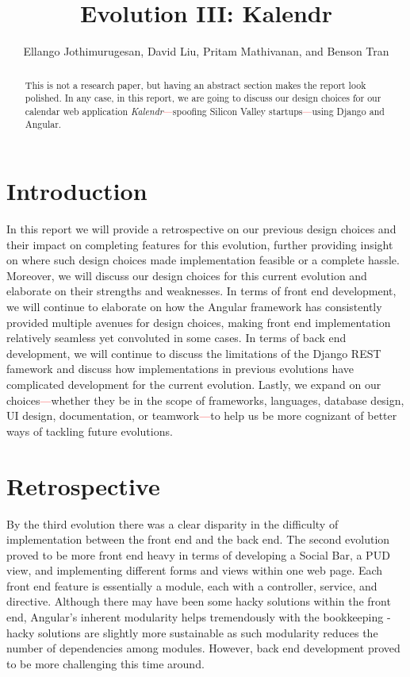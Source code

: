 \documentclass[a4paper]{article}
\title{Evolution III: Kalendr}
\author{Ellango Jothimurugesan, David Liu, Pritam Mathivanan, and Benson Tran}
\newcommand{\comment}[1]{\textcolor{red}{#1}}
\begin{document}
\maketitle

\begin{abstract}
This is not a research paper, but having an abstract section makes the report look polished. In any case, in this report, we are going to discuss our design choices for our calendar web application \textit{Kalendr}\comment{---}spoofing Silicon Valley startups\comment{---}using Django and Angular.
\end{abstract}

\section{Introduction}

In this report we will provide a retrospective on our previous design choices and their impact on completing features for this evolution, further providing insight on where such design choices made implementation feasible or a complete hassle. Moreover, we will discuss our design choices for this current evolution and elaborate on their strengths and weaknesses. In terms of front end development, we will continue to elaborate on how the Angular framework has consistently provided multiple avenues for design choices, making front end implementation relatively seamless yet convoluted in some cases. In terms of back end development, we will continue to discuss the limitations of the Django REST famework and discuss how implementations in previous evolutions have complicated development for the current evolution. Lastly, we expand on our choices\comment{---}whether they be in the scope of frameworks, languages, database design, UI design, documentation, or teamwork\comment{---}to help us be more cognizant of better ways of tackling future evolutions.

\section{Retrospective}

By the third evolution there was a clear disparity in the difficulty of implementation between the front end and the back end. The second evolution proved to be more front end heavy in terms of developing a Social Bar, a PUD view, and implementing different forms and views within one web page. Each front end feature is essentially a module, each with a controller, service, and directive. Although there may have been some hacky solutions within the front end, Angular's inherent modularity helps tremendously with the bookkeeping - hacky solutions are slightly more sustainable as such modularity reduces the number of dependencies among modules. However, back end development proved to be more challenging this time around.
\end{document}
